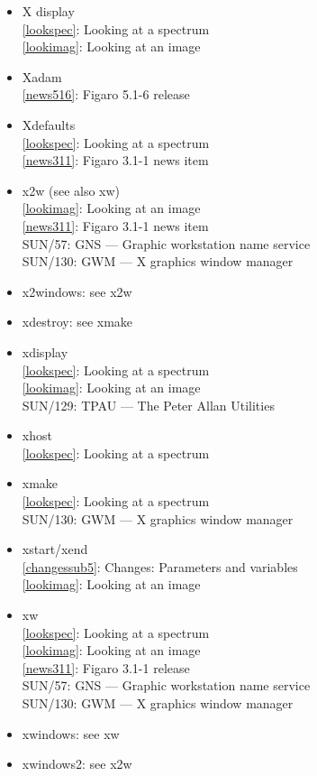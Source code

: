 \documentclass[11pt,twoside]{article}
\newcommand{\htmlref}[2]{#1}
\newcommand{\xref}[3]{#1}
\newcommand{\idxint}[2]{\ref{#1}: \htmlref{#2}{#1}}
\newcommand{\idxint}[2]{\htmlref{#2}{#1}}
\newcommand{\latorhtm}[2]{#1}
\newcommand{\latorhtm}[2]{#2}
\begin{document}
\begin{itemize}
\item X display\\
   \idxint{lookspec}{Looking at a spectrum}\\
   \idxint{lookimag}{Looking at an image}\\
\item Xadam\\
   \idxint{news516}{Figaro 5.1-6 release}\\
\item Xdefaults\\
   \idxint{lookspec}{Looking at a spectrum}\\
   \idxint{news311}{Figaro 3.1-1 news item}
\item x2w (see also xw)\\
   \idxint{lookimag}{Looking at an image}\\
   \idxint{news311}{Figaro 3.1-1 news item}\\
   \xref{SUN/57: GNS \latorhtm{---}{-} Graphic workstation name service}{sun57}{}\\
   \xref{SUN/130: GWM \latorhtm{---}{-} X graphics window manager}{sun130}{}
\item x2windows: see x2w
\item xdestroy: see xmake
\item xdisplay\\
   \idxint{lookspec}{Looking at a spectrum}\\
   \idxint{lookimag}{Looking at an image}\\
   \xref{SUN/129: TPAU \latorhtm{---}{-} The Peter Allan Utilities}{sun129}{}
\item xhost\\
   \idxint{lookspec}{Looking at a spectrum}
\item xmake\\
   \idxint{lookspec}{Looking at a spectrum}\\
   \xref{SUN/130: GWM \latorhtm{---}{-} X graphics window manager}{sun130}{}
\item xstart/xend\\
   \idxint{changessub5}{Changes: Parameters and variables}\\
   \idxint{lookimag}{Looking at an image}
\item xw\\
   \idxint{lookspec}{Looking at a spectrum}\\
   \idxint{lookimag}{Looking at an image}\\
   \idxint{news311}{Figaro 3.1-1 release}\\
   \xref{SUN/57: GNS \latorhtm{---}{-} Graphic workstation name service}{sun57}{}\\
   \xref{SUN/130: GWM \latorhtm{---}{-} X graphics window manager}{sun130}{}
\item xwindows: see xw
\item xwindows2: see x2w
\end{itemize}
\end{document}
